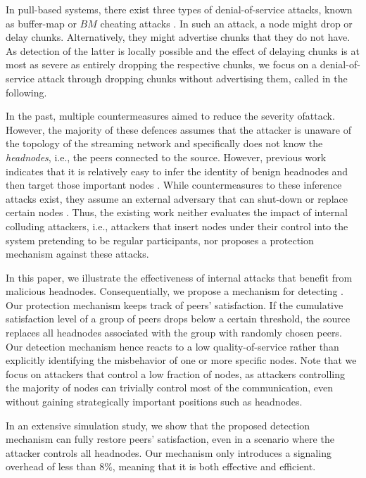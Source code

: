 In pull-based systems, there exist three types of denial-of-service attacks, known as buffer-map or $BM$ cheating attacks \cite{cheatingAnalysis}. 
In such an attack, a node might drop or delay chunks. Alternatively, they might advertise chunks that they do not have. As detection of the latter is locally possible and the effect of delaying chunks is at most as severe as entirely dropping the respective chunks, we focus on a denial-of-service attack through dropping chunks without advertising them, called \drop in the following.  


In the past, multiple countermeasures aimed to reduce the severity of\drop attack. However, the majority of these defences \cite{zhang2005coolstreaming, defending2, antiliar} assumes that the attacker is unaware of the topology of the streaming network and specifically does not know the \emph{headnodes}, i.e., the peers connected to the source. 
However, previous work indicates that it is relatively easy to infer the identity of benign headnodes and then target those important nodes \cite{nguyen2016swap}.
While countermeasures to these inference attacks exist, they assume an external adversary that can shut-down or replace certain nodes \cite{nguyen2016swap, rbcs, nguyen2014resilience}. 
Thus, the existing work neither evaluates the impact of internal colluding attackers, i.e., attackers that insert nodes under their control into the system pretending to be regular participants, nor proposes a protection mechanism against these attacks.


In this paper, we  illustrate the effectiveness of internal attacks that benefit from malicious headnodes. 
Consequentially, we propose a mechanism for detecting \drop. Our protection mechanism keeps track of peers' satisfaction. 
If the cumulative satisfaction level of a group of peers drops below a certain threshold, the source replaces all headnodes associated with the group with randomly chosen peers. 
Our detection mechanism hence reacts to a low quality-of-service rather than explicitly identifying the misbehavior of one or more specific nodes.
Note that we focus on attackers that control a low fraction of nodes, as attackers controlling the majority of nodes can trivially control most of the communication, even without gaining strategically important positions such as headnodes.    

In an extensive simulation study, we show that the proposed detection mechanism can fully restore peers' satisfaction, even in a scenario where the attacker controls all headnodes. 
Our mechanism only introduces a signaling overhead of less than $8\%$, meaning that it is both effective and efficient.

